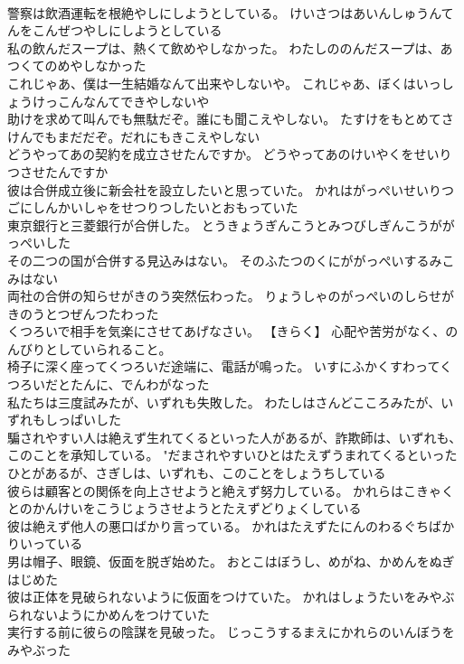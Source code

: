 \documentclass[8pt]{extreport}
\begin{document}
\begin{CJK}{UTF8}{min}
\\	警察は飲酒運転を根絶やしにしようとしている。	けいさつはあいんしゅうんてんをこんぜつやしにしようとしている 
\\	私の飲んだスープは、熱くて飲めやしなかった。	わたしののんだスープは、あつくてのめやしなかった 
\\	これじゃあ、僕は一生結婚なんて出来やしないや。	これじゃあ、ぼくはいっしょうけっこんなんてできやしないや 
\\	助けを求めて叫んでも無駄だぞ。誰にも聞こえやしない。	たすけをもとめてさけんでもまだだぞ。だれにもきこえやしない 
\\	どうやってあの契約を成立させたんですか。	どうやってあのけいやくをせいりつさせたんですか 
\\	彼は合併成立後に新会社を設立したいと思っていた。	かれはがっぺいせいりつごにしんかいしゃをせつりつしたいとおもっていた 
\\	東京銀行と三菱銀行が合併した。	とうきょうぎんこうとみつびしぎんこうががっぺいした 
\\	その二つの国が合併する見込みはない。	そのふたつのくにががっぺいするみこみはない 
\\	両社の合併の知らせがきのう突然伝わった。	りょうしゃのがっぺいのしらせがきのうとつぜんつたわった 
\\	くつろいで相手を気楽にさせてあげなさい。	【きらく】 心配や苦労がなく、のんびりとしていられること。
\\	椅子に深く座ってくつろいだ途端に、電話が鳴った。	いすにふかくすわってくつろいだとたんに、でんわがなった 
\\	私たちは三度試みたが、いずれも失敗した。	わたしはさんどこころみたが、いずれもしっぱいした 
\\	騙されやすい人は絶えず生れてくるといった人があるが、詐欺師は、いずれも、このことを承知している。	"だまされやすいひとはたえずうまれてくるといったひとがあるが、さぎしは、いずれも、このことをしょうちしている 
\\	彼らは顧客との関係を向上させようと絶えず努力している。	かれらはこきゃくとのかんけいをこうじょうさせようとたえずどりょくしている 
\\	彼は絶えず他人の悪口ばかり言っている。	かれはたえずたにんのわるぐちばかりいっている 
\\	男は帽子、眼鏡、仮面を脱ぎ始めた。	おとこはぼうし、めがね、かめんをぬぎはじめた 
\\	彼は正体を見破られないように仮面をつけていた。	かれはしょうたいをみやぶられないようにかめんをつけていた 
\\	実行する前に彼らの陰謀を見破った。	じっこうするまえにかれらのいんぼうをみやぶった 

\end{CJK}
\end{document}
